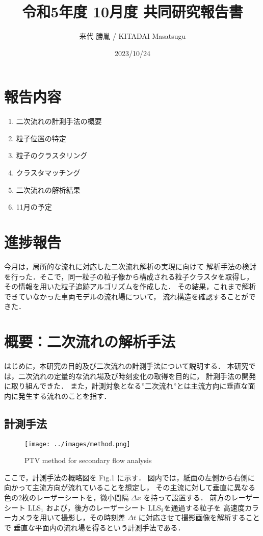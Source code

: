 \documentclass[twocolumn,a4j]{jsarticle}
\author{来代 勝胤 / KITADAI Masatsugu}
\title{令和5年度 10月度 共同研究報告書}
\date{2023/10/24}
\begin{document}
\columnseprule=0.1mm
\maketitle

\section*{報告内容}
\begin{enumerate}[1.]
	\item 二次流れの計測手法の概要
	\item 粒子位置の特定
	\item 粒子のクラスタリング
	\item クラスタマッチング
	\item 二次流れの解析結果
	\item 11月の予定
\end{enumerate}

\section*{進捗報告}
今月は，局所的な流れに対応した二次流れ解析の実現に向けて
解析手法の検討を行った．そこで，同一粒子の粒子像から構成される粒子クラスタを取得し，
その情報を用いた粒子追跡アルゴリズムを作成した．
その結果，これまで解析できていなかった車両モデルの流れ場について，
流れ構造を確認することができた．

\section{概要：二次流れの解析手法}
はじめに，本研究の目的及び二次流れの計測手法について説明する．
本研究では，二次流れの定量的な流れ場及び時刻変化の取得を目的に，
計測手法の開発に取り組んできた．
また，計測対象となる”二次流れ”とは主流方向に垂直な面内に発生する流れのことを指す．

\subsection{計測手法}
\begin{figure}[htbp]
	\centering
	\texttt{[image: ../images/method.png]}
	\caption{PTV method for secondary flow analysis}
\end{figure}

\newpage
ここで，計測手法の概略図を Fig.1 に示す．
図内では，紙面の左側から右側に向かって主流方向が流れていることを想定し，
その主流に対して垂直に異なる色の2枚のレーザーシートを，微小間隔 $\Delta x$ を持って設置する．
前方のレーザーシート LLS$_1$ および，後方のレーザーシート LLS$_2$を通過する粒子を
高速度カラーカメラを用いて撮影し，その時刻差 $\Delta t$ に対応させて撮影画像を解析することで
垂直な平面内の流れ場を得るという計測手法である．
\end{document}
